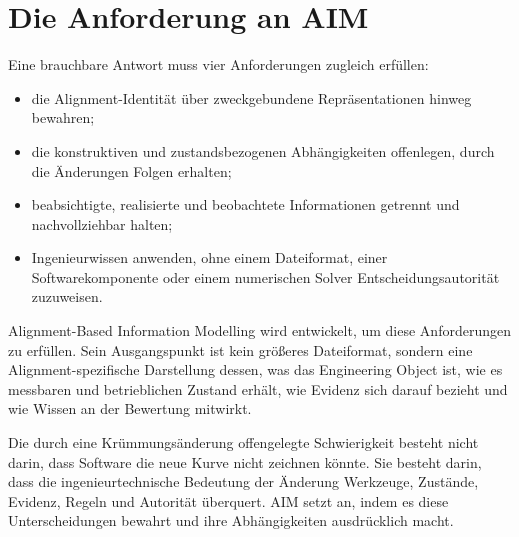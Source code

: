 \section{Die Anforderung an AIM}

Eine brauchbare Antwort muss vier Anforderungen zugleich erfüllen:

\begin{itemize}
\item die Alignment-Identität über zweckgebundene Repräsentationen hinweg
  bewahren;
\item die konstruktiven und zustandsbezogenen Abhängigkeiten offenlegen, durch
  die Änderungen Folgen erhalten;
\item beabsichtigte, realisierte und beobachtete Informationen getrennt und
  nachvollziehbar halten;
\item Ingenieurwissen anwenden, ohne einem Dateiformat, einer
  Softwarekomponente oder einem numerischen Solver Entscheidungsautorität
  zuzuweisen.
\end{itemize}

Alignment-Based Information Modelling wird entwickelt, um diese Anforderungen
zu erfüllen. Sein Ausgangspunkt ist kein größeres Dateiformat, sondern eine
Alignment-spezifische Darstellung dessen, was das Engineering Object ist, wie
es messbaren und betrieblichen Zustand erhält, wie Evidenz sich darauf bezieht
und wie Wissen an der Bewertung mitwirkt.

\begin{summary}
Die durch eine Krümmungsänderung offengelegte Schwierigkeit besteht nicht
darin, dass Software die neue Kurve nicht zeichnen könnte. Sie besteht darin,
dass die ingenieurtechnische Bedeutung der Änderung Werkzeuge, Zustände,
Evidenz, Regeln und Autorität überquert. AIM setzt an, indem es diese
Unterscheidungen bewahrt und ihre Abhängigkeiten ausdrücklich macht.
\end{summary}
